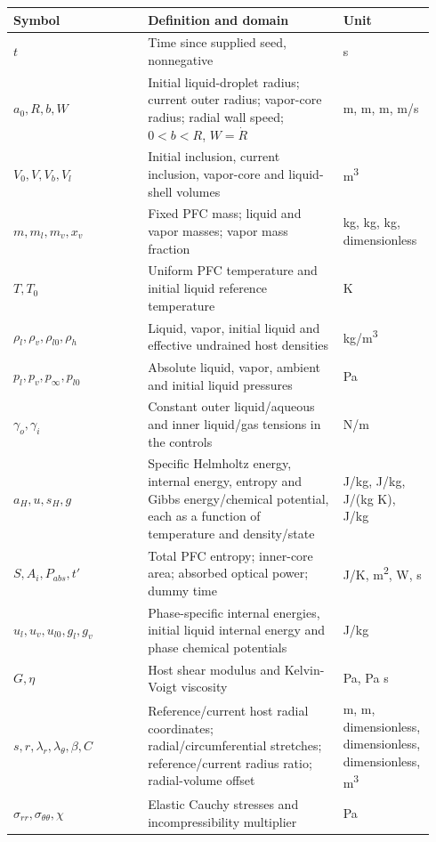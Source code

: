 \documentclass[10pt,a4paper]{article}
\begin{document}
\begin{longtable}{>{\raggedright\arraybackslash}p{0.31\linewidth}>{\raggedright\arraybackslash}p{0.45\linewidth}>{\raggedright\arraybackslash}p{0.18\linewidth}}
\toprule
\textbf{Symbol} & \textbf{Definition and domain} & \textbf{Unit}\\\midrule\endhead
$t$ & Time since supplied seed, nonnegative & s\\[4pt]
$a_0,R,b,W$ & Initial liquid-droplet radius; current outer radius; vapor-core radius; radial wall speed; $0<b<R$, $W=\dot R$ & m, m, m, m/s\\[4pt]
$V_0,V,V_b,V_l$ & Initial inclusion, current inclusion, vapor-core and liquid-shell volumes & m\textsuperscript{3}\\[4pt]
$m,m_l,m_v,x_v$ & Fixed PFC mass; liquid and vapor masses; vapor mass fraction & kg, kg, kg, dimensionless\\[4pt]
$T,T_0$ & Uniform PFC temperature and initial liquid reference temperature & K\\[4pt]
$\rho_l,\rho_v,\rho_{l0},\rho_h$ & Liquid, vapor, initial liquid and effective undrained host densities & kg/m\textsuperscript{3}\\[4pt]
$p_l,p_v,p_\infty,p_{l0}$ & Absolute liquid, vapor, ambient and initial liquid pressures & Pa\\[4pt]
$\gamma_o,\gamma_i$ & Constant outer liquid/aqueous and inner liquid/gas tensions in the controls & N/m\\[4pt]
$a_H,u,s_H,g$ & Specific Helmholtz energy, internal energy, entropy and Gibbs energy/chemical potential, each as a function of temperature and density/state & J/kg, J/kg, J/(kg K), J/kg\\[4pt]
$S,A_i,P_{abs},t'$ & Total PFC entropy; inner-core area; absorbed optical power; dummy time & J/K, m\textsuperscript{2}, W, s\\[4pt]
$u_l,u_v,u_{l0},g_l,g_v$ & Phase-specific internal energies, initial liquid internal energy and phase chemical potentials & J/kg\\[4pt]
$G,\eta$ & Host shear modulus and Kelvin-Voigt viscosity & Pa, Pa s\\[4pt]
$s,r,\lambda_r,\lambda_\theta,\beta,C$ & Reference/current host radial coordinates; radial/circumferential stretches; reference/current radius ratio; radial-volume offset & m, m, dimensionless, dimensionless, dimensionless, m\textsuperscript{3}\\[4pt]
$\sigma_{rr},\sigma_{\theta\theta},\chi$ & Elastic Cauchy stresses and incompressibility multiplier & Pa\\[4pt]

\end{longtable}
\end{document}
